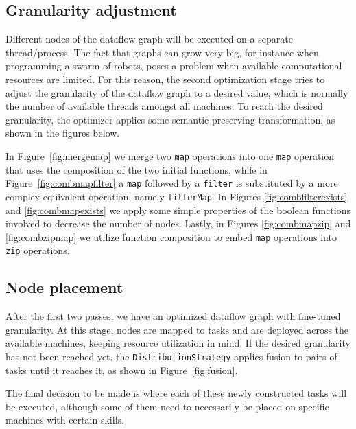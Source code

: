 \documentclass[sigplan,screen,review,anonymous]{acmart}
\begin{document}
\subsection{Granularity adjustment}
Different nodes of the dataflow graph will be executed on a separate
thread/process. The fact that graphs can grow very big, for instance when
programming a swarm of robots, poses a problem when available
computational resources are limited. For this reason, the second optimization
stage tries to adjust the granularity of the dataflow graph to a desired value,
which is normally the number of available threads amongst all machines.
To reach the desired granularity, the optimizer applies some semantic-preserving
transformation, as shown in the figures below.


In Figure~\ref{fig:mergemap} we merge two \texttt{map} operations into
one \texttt{map} operation that uses the composition of the two initial
functions, while in Figure~\ref{fig:combmapfilter} a \texttt{map} followed
by a \texttt{filter} is substituted by a more complex equivalent operation,
namely \texttt{filterMap}. In Figures \ref{fig:combfilterexists} and
\ref{fig:combmapexists} we apply some simple properties of the boolean functions
involved to decrease the number of nodes. Lastly, in Figures \ref{fig:combmapzip} and
\ref{fig:combzipmap} we utilize function composition to embed \texttt{map}
operations into \texttt{zip} operations.

\subsection{Node placement}

After the first two passes, we have an optimized dataflow graph with fine-tuned
granularity. At this stage, nodes are mapped to tasks and are deployed across
the available machines, keeping resource utilization in mind.
If the desired granularity has not been reached yet, the
\texttt{DistributionStrategy} applies fusion to pairs of tasks until it reaches
it, as shown in Figure~\ref{fig:fusion}.
%

The final decision to be made is where each of these newly constructed tasks
will be executed, although some of them need to necessarily be placed on
specific machines with certain skills.
\end{document}

